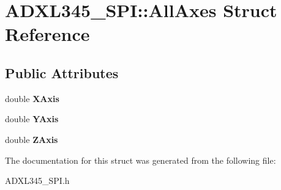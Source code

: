 \hypertarget{structADXL345__SPI_1_1AllAxes}{\section{\-A\-D\-X\-L345\-\_\-\-S\-P\-I\-:\-:\-All\-Axes \-Struct \-Reference}
\label{structADXL345__SPI_1_1AllAxes}
}
\subsection*{\-Public \-Attributes}
\begin{DoxyCompactItemize}
\item 
\hypertarget{structADXL345__SPI_1_1AllAxes_a9c0af06b615634557a838befebb72db0}{double {\bfseries \-X\-Axis}}\label{structADXL345__SPI_1_1AllAxes_a9c0af06b615634557a838befebb72db0}

\item 
\hypertarget{structADXL345__SPI_1_1AllAxes_a611d20158e7573953e3aeadfef94fb91}{double {\bfseries \-Y\-Axis}}\label{structADXL345__SPI_1_1AllAxes_a611d20158e7573953e3aeadfef94fb91}

\item 
\hypertarget{structADXL345__SPI_1_1AllAxes_a1cf27446218feaebdcd7f5aae4ba6acb}{double {\bfseries \-Z\-Axis}}\label{structADXL345__SPI_1_1AllAxes_a1cf27446218feaebdcd7f5aae4ba6acb}

\end{DoxyCompactItemize}


\-The documentation for this struct was generated from the following file\-:\begin{DoxyCompactItemize}
\item 
\-A\-D\-X\-L345\-\_\-\-S\-P\-I.\-h\end{DoxyCompactItemize}
